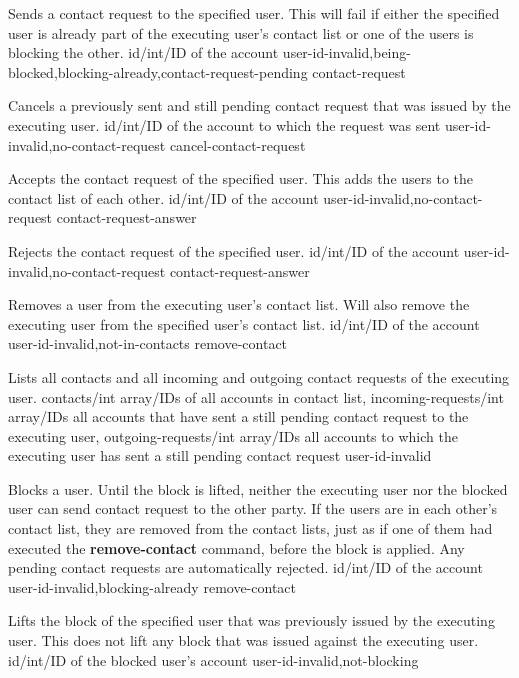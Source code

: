 \documentclass[parskip=full,11pt]{scrartcl}
\begin{document}
{Sends a contact request to the specified user.
This will fail if either the specified user is already part of the executing
user's contact list or one of the users is blocking the other.}
{id/int/ID of the account}
{}
{user-id-invalid,being-blocked,blocking-already,contact-request-pending}
{contact-request}

{Cancels a previously sent and still pending contact request that was issued
by the executing user.}
{id/int/ID of the account to which the request was sent}
{}
{user-id-invalid,no-contact-request}
{cancel-contact-request}

{Accepts the contact request of the specified user.
This adds the users to the contact list of each other.}
{id/int/ID of the account}
{}
{user-id-invalid,no-contact-request}
{contact-request-answer}

{Rejects the contact request of the specified user.}
{id/int/ID of the account}
{}
{user-id-invalid,no-contact-request}
{contact-request-answer}

{Removes a user from the executing user's contact list.
Will also remove the executing user from the specified user's contact list.}
{id/int/ID of the account}
{}
{user-id-invalid,not-in-contacts}
{remove-contact}

{Lists all contacts and all incoming and outgoing contact requests of the
executing user.}
{}
{contacts/int array/IDs of all accounts in contact list,
incoming-requests/int array/IDs all accounts that have sent a still pending
contact request to the executing user,
outgoing-requests/int array/IDs all accounts to which the executing user has
sent a still pending contact request}
{user-id-invalid}
{}

{Blocks a user.
Until the block is lifted, neither the executing user nor the blocked user can
send contact request to the other party.
If the users are in each other's contact list, they are removed from the
contact lists, just as if one of them had executed the \textbf{remove-contact}
command, before the block is applied.
Any pending contact requests are automatically rejected.}
{id/int/ID of the account}
{}
{user-id-invalid,blocking-already}
{remove-contact}

{Lifts the block of the specified user that was previously issued by the
executing user.
This does not lift any block that was issued against the executing user.}
{id/int/ID of the blocked user's account}
{}
{user-id-invalid,not-blocking}
{}
\end{document}
